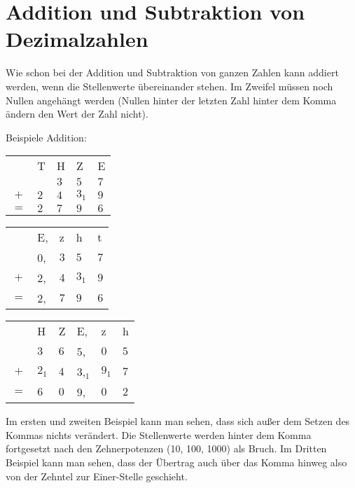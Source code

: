 \section{Addition und Subtraktion von Dezimalzahlen}\vspace{-1em}
Wie schon bei der Addition und Subtraktion von ganzen Zahlen kann addiert werden, wenn die Stellenwerte übereinander stehen. Im Zweifel müssen noch Nullen angehängt werden (Nullen hinter der letzten Zahl hinter dem Komma ändern den Wert der Zahl nicht).

Beispiele Addition:\\
\begin{tabular}{cllll}
	& T   & H   & Z     & E   \\
	&     & $3$ & $5$   & $7$ \\
	$+$ & $2$ & $4$ & $3_1$ & $9$ \\ \hline
	$=$ & $2$ & $7$ & $9$   & $6$
\end{tabular}
%
\hfill
%
\begin{tabular}{cllll}
	& E,   & z   & h     & t   \\
	&    $0$, & $3$ & $5$   & $7$ \\
	$+$ & $2$, & $4$ & $3_1$ & $9$ \\ \hline
	$=$ & $2$, & $7$ & $9$   & $6$
\end{tabular}
%
\hfill
%
\begin{tabular}{clllll}
	& H   & Z   &  E,    & z & h   \\
	& $3$ & $6$ & $5$, & $0$ & $5$ \\
	$+$ & $2_1$ & $4$ & $3$,$_1$ & $9_1$ & $7$ \\ \hline
	$=$ & $6$ & $0$ & $9$,   & $0$ & $2$
\end{tabular}
%

Im ersten und zweiten Beispiel kann man sehen, dass sich außer dem Setzen des Kommas nichts verändert. Die Stellenwerte werden hinter dem Komma fortgesetzt nach den Zehnerpotenzen (10, 100, 1000) als Bruch. Im Dritten Beispiel kann man sehen, dass der Übertrag auch über das Komma hinweg also von der Zehntel zur Einer-Stelle geschieht.

